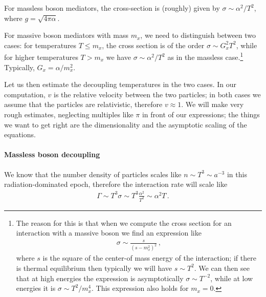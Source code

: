 \documentclass[main.tex]{subfiles}
\begin{document}

For massless boson mediators, the cross-section is (roughly) given by \(\sigma \sim \alpha^2 / T^2\), where \(g = \sqrt{4 \pi \alpha }\).

For massive boson mediators with mass \(m_x\), we need to distinguish between two cases: for temperatures \(T \leq m_{x}\), the cross section is of the order \(\sigma \sim G_x^2 T^2\), while for higher temperatures \(T > m_x\) we have \(\sigma \sim \alpha^2 / T^2\) as in the massless case.\footnote{The reason for this is that when we compute the cross section for an interaction with a massive boson we find an expression like 
%
\begin{align}
\sigma \sim \frac{s}{(s - m_x^2)^2}
\,,
\end{align}
%
where \(s\) is the square of the center-of mass energy of the interaction; if there is thermal equilibrium then typically we will have \(s \sim T^2\). We can then see that at high energies the expression is asymptotically \(\sigma \sim T^{-2}\), while at low energies it is \(\sigma \sim T^2 / m_x^{4}\). This expression also holds for \(m_x = 0\). 
}
Typically, \(G_x = \alpha / m_x^2\). 


Let us then estimate the decoupling temperatures in the two cases. 
In our computation, \(v\) is the relative velocity between the two particles; in both cases we assume that the particles are relativistic, therefore \(v \approx 1\). 
We will make very rough estimates, neglecting multiples like \(\pi \) in front of our expressions; the things we want to get right are the dimensionality and the asymptotic scaling of the equations.

\paragraph{Massless boson decoupling}

We know that the number density of particles scales like \(n \sim T^3 \sim a^{-3}\) in this radiation-dominated epoch, therefore the interaction rate will scale like 
%
\begin{align}
\Gamma \sim T^3 \sigma \sim T^{3} \frac{\alpha^2}{T^2} \sim \alpha^2 T
\,.
\end{align}
\end{document}
